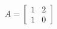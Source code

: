 \documentclass[preview]{standalone}
\begin{document}
\begin{center}
$A = \begin{bmatrix} 1 & 2 \\ 1 & 0 \end{bmatrix}$
\end{center}
\end{document}
